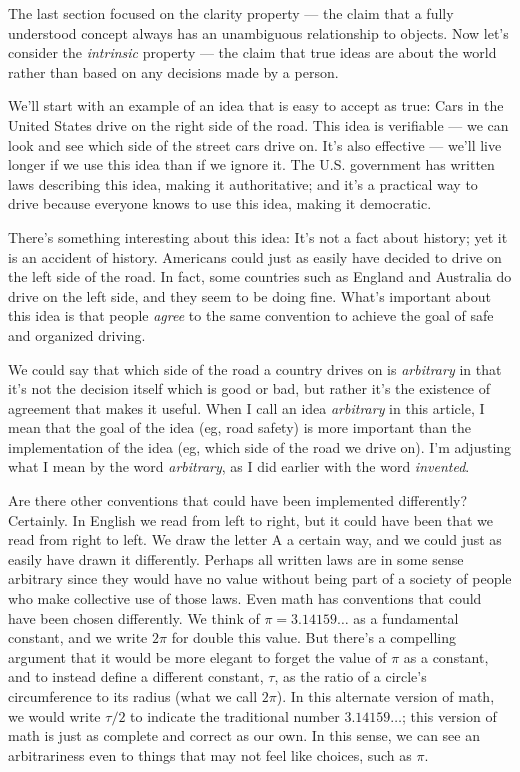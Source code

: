 \documentclass[11pt, oneside]{article}   	%
\begin{document}
The last section focused on the clarity property --- the claim that a fully
understood
concept always has an unambiguous relationship to objects.
Now let's
consider the {\em intrinsic} property --- the claim that true ideas are about
the world
rather
than based on any decisions made by a person.


We'll start with an example of an
idea that is easy to accept as true:
Cars in the United States drive on the right side of the road.
This idea is verifiable --- we can look and see which side of the street cars
drive on.
It's also effective --- we'll live
longer if we use this idea than if we ignore it.
The U.S.
government has written laws describing this idea, making it authoritative;
and it's a practical
way to drive
because everyone knows to use this idea, making it democratic.

There's something interesting about this idea:
It's not a fact about history; yet it is an accident of history.
Americans could just as
easily have decided to drive on the left side of the road. In fact,
some countries such as England and Australia do drive on the left side, and they
seem to be doing fine. What's important about this idea is that people
{\em agree} to the same convention to achieve the goal of
safe and organized driving.

We could say that which side of the road a country drives on is {\em arbitrary}
in that it's not the decision itself which is good or bad, but rather it's the
existence of agreement that makes it useful.
When I call an idea {\em arbitrary}
in this article, I mean that the goal of the idea (eg, road safety) is more
important than the implementation of the idea (eg, which side of the road we
drive on).
I'm adjusting what I mean by the word {\em arbitrary}, as I did earlier with the
word {\em invented}.

Are there other conventions that could have been implemented differently?
Certainly. In English we read from left to right, but it could have been that we
read from right to left. We draw the letter A a certain way, and we could just
as easily have drawn it differently. Perhaps all written laws are in some sense
arbitrary since they would have no value without being part of a society of
people who make collective use of those laws.
Even math has conventions that could have been chosen differently.
We
think of $\pi=3.14159\ldots$ as a fundamental constant, and we write $2\pi$ for
double this value.
But there's a compelling argument that it would be more elegant to forget the
value of $\pi$ as a constant, and to instead define a different constant,
$\tau$, as the ratio of a circle's circumference to its radius (what we call
$2\pi$). In this alternate version of math, we would write $\tau/2$ to indicate
the traditional number $3.14159\ldots$; this version of math is just as
complete and correct as our own. In this sense, we can see an arbitrariness even
to things that may not feel like choices, such as $\pi$.
\end{document}
